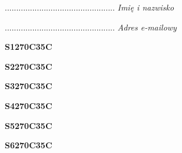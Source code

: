 \begin{turn}{90}\begin{minipage}{\linewidth} \vspace{20mm} ................................................  \textit{Imię i nazwisko}\end{minipage}\end{turn}

\begin{turn}{90}\begin{minipage}{\linewidth} \vspace{20mm} ................................................  \textit{Adres e-mailowy}\end{minipage}\end{turn}

\begin{turn}{90}\huge \begin{minipage}{\linewidth} \vspace{10mm}\textbf{S1270C35C}\end{minipage}\end{turn}

\begin{turn}{90}\huge \begin{minipage}{\linewidth} \vspace{10mm}\textbf{S2270C35C}\end{minipage}\end{turn}

\begin{turn}{90}\huge \begin{minipage}{\linewidth} \vspace{10mm}\textbf{S3270C35C}\end{minipage}\end{turn}

\begin{turn}{90}\huge \begin{minipage}{\linewidth} \vspace{10mm}\textbf{S4270C35C}\end{minipage}\end{turn}

\begin{turn}{90}\huge \begin{minipage}{\linewidth} \vspace{10mm}\textbf{S5270C35C}\end{minipage}\end{turn}

\begin{turn}{90}\huge \begin{minipage}{\linewidth} \vspace{10mm}\textbf{S6270C35C}\end{minipage}\end{turn}

